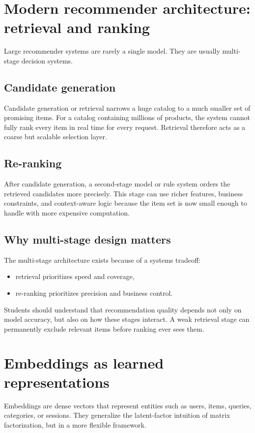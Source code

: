 \section{Modern recommender architecture: retrieval and ranking}
Large recommender systems are rarely a single model.
They are usually multi-stage decision systems.

\subsection{Candidate generation}
Candidate generation or retrieval narrows a huge catalog to a much smaller set of promising items.
For a catalog containing millions of products, the system cannot fully rank every item in real time for every request.
Retrieval therefore acts as a coarse but scalable selection layer.

\subsection{Re-ranking}
After candidate generation, a second-stage model or rule system orders the retrieved candidates more precisely.
This stage can use richer features, business constraints, and context-aware logic because the item set is now small enough to handle with more expensive computation.

\subsection{Why multi-stage design matters}
The multi-stage architecture exists because of a systems tradeoff:
\begin{itemize}
  \item retrieval prioritizes speed and coverage,
  \item re-ranking prioritizes precision and business control.
\end{itemize}

Students should understand that recommendation quality depends not only on model accuracy, but also on how these stages interact.
A weak retrieval stage can permanently exclude relevant items before ranking ever sees them.

\section{Embeddings as learned representations}
Embeddings are dense vectors that represent entities such as users, items, queries, categories, or sessions.
They generalize the latent-factor intuition of matrix factorization, but in a more flexible framework.

